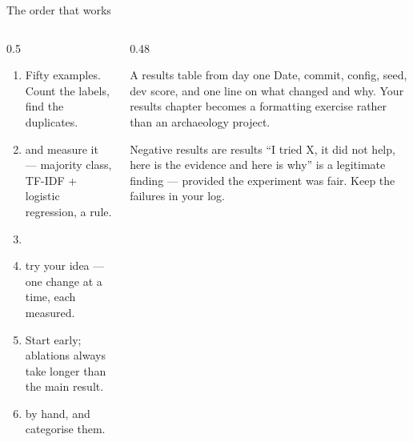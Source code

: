\documentclass[aspectratio=169,11pt]{beamer}
\begin{document}
\begin{frame}{The order that works}
\begin{columns}[T]
\begin{column}{0.5\textwidth}
\begin{enumerate}
  \item {} Fifty examples. Count the
        labels, find the duplicates.
  \item {} and measure it --- majority class,
        TF-IDF + logistic regression, a rule.
  \item {}
  \item {} try your idea --- one change at a time, each measured.
  \item {} Start early; ablations always take longer than the main
        result.
  \item {} by hand, and categorise them.
\end{enumerate}
\end{column}
\begin{column}{0.48\textwidth}
\begin{block}{A results table from day one}
\footnotesize
Date, commit, config, seed, dev score, and one line on what changed and why.
Your results chapter becomes a formatting exercise rather than an archaeology
project.
\end{block}
\begin{block}{Negative results are results}
\footnotesize
``I tried X, it did not help, here is the evidence and here is why'' is a
legitimate finding --- provided the experiment was fair. Keep the failures in
your log.
\end{block}
\end{column}
\end{columns}
\end{frame}
\end{document}
